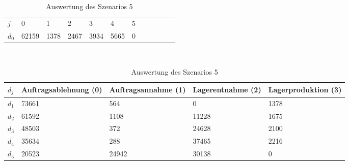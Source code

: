 \begin{table}[h!]
\renewcommand{\arraystretch}{1.5}
  \begin{center}
    \caption{Auswertung des Szenarios 5}  \label{AS5}
    \vspace*{3mm}
    \begin{tabular}{l l l l l l l l l l l l }  \hline 
         $j$ & 0 & 1  & 2 & 3 & 4  & 5   \\  
$d_{0}$ &  62159 &  1378 &  2467 &  3934 &  5665 &  0 \\
\hline
    \end{tabular} \\[3mm]
        \begin{tabular}{ l p{2.5cm} p{2.5cm} p{2.5cm} p{2.5cm} }   \hline    %
    $d_j$ & Auftrags\-ablehnung (0) & Auftrags\-annahme (1)  & Lager\-entnahme (2) & Lager\-produktion (3)\\\hline 
$d_1$ &  73661 &    564 &    0 &  1378 \\
$d_2$ &  61592 &   1108 &  11228 &  1675 \\
$d_3$ &  48503 &    372 &  24628 &  2100 \\
$d_4$ &  35634 &    288 &  37465 &  2216 \\
$d_5$ &  20523 &  24942 &  30138 &   0 \\
          \hline
   \end{tabular} \\[3mm]
     \end{center}
\end{table}



